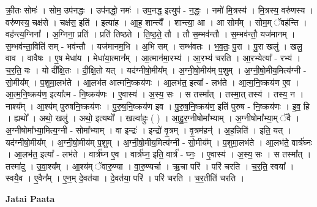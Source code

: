 \documentclass[17pt]{extarticle}
\begin{document}
क्री॒तः सोमः॑ । सोम॒ उप॑नद्धः । उप॑नद्धो॒ नमः॑ । उप॒नद्ध॒ इत्युप॑ - न॒द्धः॒ । नमो॑ मि॒त्रस्य॑ । मि॒त्रस्य॒ वरु॑णस्य । वरु॑णस्य॒ चक्ष॑से । चक्ष॑स॒ इति॑ । इत्या॑ह । आ॒ह॒ शान्त्यै᳚ । शान्त्या॒ आ । आ सोम᳚म् । सोम॒म् ॅवह॑न्ति । वह॑न्त्य॒ग्निना᳚ । अ॒ग्निना॒ प्रति॑ । प्रति॑ तिष्ठते । ति॒ष्ठ॒ते॒ तौ । तौ स॒म्भव॑न्तौ । स॒म्भव॑न्तौ॒ यज॑मानम् । स॒म्भव॑न्ता॒विति॑ सम् - भव॑न्तौ । यज॑मानम॒भि । अ॒भि सम् । सम्भ॑वतः । भ॒व॒तः॒ पु॒रा । पु॒रा खलु॑ । खलु॒ वाव । वावैषः । ए॒ष मेधा॑य । मेधा॑या॒त्मान᳚म् । आ॒त्मान॑मा॒रभ्य॑ । आ॒रभ्य॑ चरति । आ॒रभ्येत्या᳚ - रभ्य॑ । च॒र॒ति॒ यः । यो दी᳚क्षि॒तः । दी॒क्षि॒तो यत् । यद॑ग्नीषो॒मीय᳚म् । अ॒ग्नी॒षो॒मीय॑म् प॒शुम् । अ॒ग्नी॒षो॒मीय॒मित्य॑ग्नी - सो॒मीय᳚म् । प॒शुमा॒लभ॑ते । आ॒लभ॑त आत्मनि॒ष्क्रय॑णः । आ॒लभ॑त॒ इत्या᳚ - लभ॑ते । आ॒त्म॒नि॒ष्क्रय॑ण ए॒व । आ॒त्म॒नि॒ष्क्रय॑ण॒ इत्या᳚त्म - नि॒ष्क्रय॑णः । ए॒वास्य॑ । अ॒स्य॒ सः । स तस्मा᳚त् । तस्मा॒त् तस्य॑ । तस्य॒ न । नाश्य᳚म् । आ॒श्य॑म् पुरुषनि॒ष्क्रय॑णः । पु॒रु॒ष॒नि॒ष्क्रय॑ण इव । पु॒रु॒ष॒नि॒ष्क्रय॑ण॒ इति॑ पुरुष - नि॒ष्क्रय॑णः । इ॒व॒ हि । ह्यथो᳚ । अथो॒ खलु॑ । अथो॒ इत्यथो᳚ । खल्वा॑हुः ( ) । आ॒हु॒र॒ग्नीषोमा᳚भ्याम् । अ॒ग्नीषोमा᳚भ्या॒म् ॅवै । अ॒ग्नीषोमा᳚भ्या॒मित्य॒ग्नी - सोमा᳚भ्याम् । वा इन्द्रः॑ । इन्द्रो॑ वृ॒त्रम् । वृ॒त्रम॑हन्॑ । अ॒ह॒न्निति॑ । इति॒ यत् । यद॑ग्नीषो॒मीय᳚म् । अ॒ग्नी॒षो॒मीय॑म् प॒शुम् । अ॒ग्नी॒षो॒मीय॒मित्य॑ग्नी - सो॒मीय᳚म् । प॒शुमा॒लभ॑ते । आ॒लभ॑ते॒ वार्त्र॑घ्नः । आ॒लभ॑त॒ इत्या᳚ - लभ॑ते । वार्त्र॑घ्न ए॒व । वार्त्र॑घ्न॒ इति॒ वार्त्र॑ - घ्नः॒ । ए॒वास्य॑ । अ॒स्य॒ सः । स तस्मा᳚त् । तस्मा॑दु । उ॒वा॒श्य᳚म् । आ॒श्य॑म् ॅवारु॒ण्या । वा॒रु॒ण्यर्चा । ऋ॒चा परि॑ । परि॑ चरति । च॒र॒ति॒ स्वया᳚ । स्वयै॒व । ए॒वैन᳚म् । ए॒न॒म् दे॒वत॑या । दे॒वत॑या॒ परि॑ । परि॑ चरति । च॒र॒तीति॑ चरति । \newline

\textbf{Jatai Paata} \newline
\end{document}
